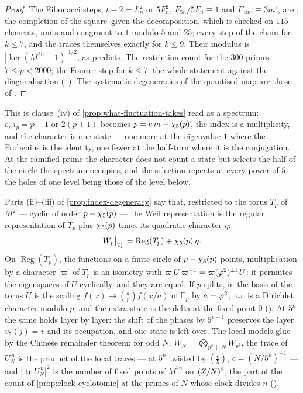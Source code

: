 \begin{proof}
{The Fibonacci steps, $t-2=L_n^2$ or $5F_n^2$, $F_{5n}/5F_n\equiv1$ and $F_{4m'}\equiv3m'$, are ; the completion of the square\ given the decomposition, which is checked on $115$ elements, units and congruent to $1$ modulo $5$ and $25$; every
step of the chain for $k\le7$, and the traces themselves exactly for $k\le9$.  Their modulus is
$|\ker(M^{2n}-1)|^{1/2}$, as \cite{thomas08} predicts.  The restriction count for the $300$ primes $7\le p<2000$;
the Fourier step for $k\le7$; the whole statement against the diagonalisation
(--).  The systematic degeneracies of the quantised map are those of
\cite{kurlbergrudnick00}.\par}
\end{proof}

This is clause~(iv) of \cref{prop:what-fluctuation-takes} read as a spectrum: $e_p\,i_p=p-1$ or $2(p+1)$ becomes
$p=e\,m+\chi_5(p)$, the index is a multiplicity, and the character is one state --- one more at the eigenvalue $1$
where the Frobenius is the identity, one fewer at the half-turn where it is the conjugation.  At the ramified prime
the character does not count a state but selects the half of the circle the spectrum occupies, and the selection
repeats at every power of $5$, the holes of one level being those of the level below.

\begin{remark}\label{rmk:regular-plus-character}
Parts (ii)--(iii) of \cref{prop:index-degeneracy} say that, restricted to the torus $T_p$ of $M^2$ --- cyclic of order
$p-\chi_5(p)$ --- the Weil representation is the regular representation of $T_p$ plus $\chi_5(p)$ times its quadratic
character $\eta$:
\[
  W_p\big|_{T_p}=\operatorname{Reg}(T_p)+\chi_5(p)\,\eta .
\]
On $\operatorname{Reg}(T_p)$, the functions on a finite circle of $p-\chi_5(p)$ points, multiplication by a character
$\varpi$ of $T_p$ is an isometry with $\varpi\,U\,\varpi^{-1}=\varpi(\varphi^2)^{\pm1}U$: it permutes the eigenspaces of $U$
cyclically, and they are equal.  If $p$ splits, in the basis of the torus $U$ is the scaling
$f(x)\mapsto(\tfrac{a}{p})f(x/a)$ of $\mathbb F_p$ by $a=\varphi^2$, $\varpi$ is a Dirichlet character modulo $p$, and the
extra state is the delta at the fixed point $0$ ().  At $5^k$ the same holds layer by layer:
the shift of the phases by $5^{v+1}$ preserves the layer $v_5(j)=v$ and its occupation, and one state is left over.
The local models glue by the Chinese remainder theorem: for odd $N$, $W_N=\bigotimes_{p^k\,\|\,N}W_{p^k}$, the trace of
$U_N^{\,n}$ is the product of the local traces --- at $5^k$ twisted by $(\tfrac{c}{5})$, $c=(N/5^k)^{-1}$ --- and
$|\operatorname{tr}U_N^{\,n}|^2$ is the number of fixed points of $M^{2n}$ on $(Z/N)^2$, the part of the count of
\cref{prop:clock-cyclotomic} at the primes of $N$ whose clock divides $n$ ().
\end{remark}

